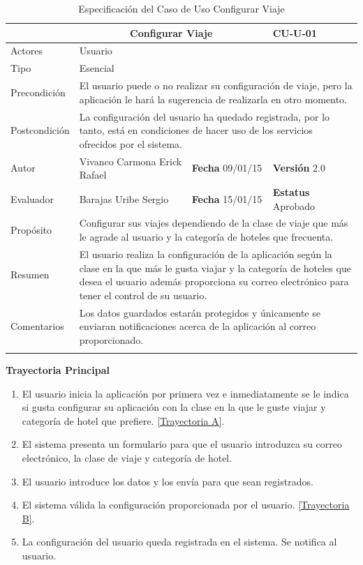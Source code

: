 \begin{longtable}[h]{|p{2.5cm}|p{6.4cm}|p{2cm}|p{2cm}|}
	\hline
		\rowcolor[RGB]{51,153,255}{Caso de Uso}&\multicolumn{2}{c}{Configurar Viaje}&{\textbf{CU-U-01}}\\
	\hline
		{Actores}&\multicolumn{3}{p{11.2cm}|}{Usuario}\\
	\hline
		{Tipo}&\multicolumn{3}{p{11.2cm}|}{Esencial}\\
	\hline
		{Precondición}&\multicolumn{3}{p{11.2cm}|}{El usuario puede o no realizar su configuración de viaje, pero la aplicación le hará la sugerencia de realizarla en otro momento.}\\
	\hline
		{Postcondición}&\multicolumn{3}{p{11.2cm}|}{La configuración del usuario ha quedado registrada, por lo tanto, está en condiciones de hacer uso de los servicios ofrecidos por el sistema.}\\
	\hline
		{Autor}&{Vivanco Carmona Erick Rafael}&{\textbf{Fecha} 09/01/15}&{\textbf{Versión} 2.0}\\
			\hline
		{Evaluador}&{Barajas Uribe Sergio}&{\textbf{Fecha} 15/01/15}&{\textbf{Estatus} Aprobado}\\
	\hline
		{Propósito}&\multicolumn{3}{p{11.2cm}|}{Configurar sus viajes dependiendo de la clase de viaje que más le agrade al usuario y la categoría de hoteles que frecuenta.}\\
	\hline
		{Resumen}&\multicolumn{3}{p{11.2cm}|}{El usuario realiza la configuración de la aplicación según la clase en la que más le gusta viajar y la categoría de hoteles que desea el usuario además proporciona su correo electrónico para tener el control de su usuario.}\\	
	\hline
		{Comentarios}&\multicolumn{3}{p{11.2cm}|}{Los datos guardados estarán protegidos y únicamente se enviaran notificaciones acerca de la aplicación al correo proporcionado.}\\	
	\hline
	\caption[Especificación del Caso de Uso Configurar Viaje]{Especificación del Caso de Uso Configurar Viaje}
    	\label{tab:cuConfigurarViaje}
\end{longtable}
\newpage
\begin{flushleft}
	\textbf{Trayectoria Principal}\\
	\begin{enumerate}
		\item El usuario inicia la aplicación por primera vez e inmediatamente se le indica si gusta configurar su aplicación con la clase en la que le guste viajar y categoría de hotel que prefiere. \hyperlink{TrayectoriaA_CU-U-01}{[Trayectoria A]}.
		\item El sistema presenta un formulario para que el usuario introduzca su correo electrónico, la clase de viaje y categoría de hotel.
		\item El usuario introduce los datos y los envía para que sean registrados.
		\item El sistema válida la configuración proporcionada por el usuario. \hyperlink{TrayectoriaB_CU-U-01}{[Trayectoria B]}.
		\item La configuración del usuario queda registrada en el sistema. Se notifica al usuario.
	\end{enumerate}
\end{flushleft}

